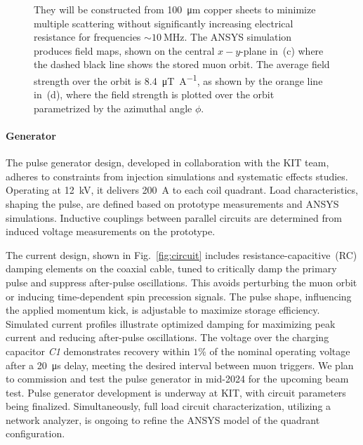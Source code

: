 \begin{refsection}
\begin{figure}
{            They will be constructed from \SI{100}{\micro m} copper sheets to minimize multiple scattering without significantly increasing electrical resistance for frequencies $\sim \SI{10}{\mega\hertz}$.
            The ANSYS simulation produces field maps, shown on the central $x-y$-plane in~(c) where the dashed black line shows the stored muon orbit. 
            The average field strength over the orbit is \SI{8.4}{\micro\tesla\per\ampere}, as shown by the orange line in~(d), where the field strength is plotted over the orbit parametrized by the azimuthal angle $\phi$.}
        \label{fig:coils}
        \end{figure}
        
        \paragraph{Generator}
        The pulse generator design, developed in collaboration with the KIT team, adheres to constraints from injection simulations and systematic effects studies. 
        Operating at \SI{12}{kV}, it delivers \SI{200}{A} to each coil quadrant. 
        Load characteristics, shaping the pulse, are defined based on prototype measurements and ANSYS simulations. 
        Inductive couplings between parallel circuits are determined from induced voltage measurements on the prototype.
        
        The current design, shown in Fig.~\ref{fig:circuit} includes resistance-capacitive~(RC) damping elements on the coaxial cable, tuned to critically damp the primary pulse and suppress after-pulse oscillations. 
        This avoids perturbing the muon orbit or inducing time-dependent spin precession signals. 
        The pulse shape, influencing the applied momentum kick, is adjustable to maximize storage efficiency. 
        Simulated current profiles illustrate optimized damping for maximizing peak current and reducing after-pulse oscillations. 
        The voltage over the charging capacitor \textit{C1} demonstrates recovery within $1\%$ of the nominal operating voltage after a \SI{20}{\micro s} delay, meeting the desired interval between muon triggers.
        We plan to commission and test the pulse generator in mid-2024 for the upcoming beam test. 
        Pulse generator development is underway at KIT, with circuit parameters being finalized. Simultaneously, full load circuit characterization, utilizing a network analyzer, is ongoing to refine the ANSYS model of the quadrant configuration.
            

\end{refsection}
